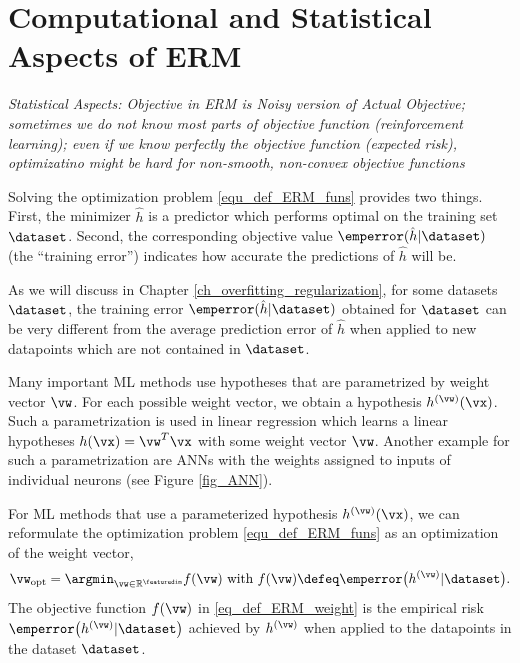 \documentclass[12pt]{report}
\begin{document}
\section{Computational and Statistical Aspects of ERM}
\label{sec_comp_stat_ERM}

\emph{Statistical Aspects: Objective in ERM is Noisy version of Actual Objective; sometimes we do 
not know most parts of objective function (reinforcement learning); even if we know perfectly 
the objective function (expected risk), optimizatino might be hard for non-smooth, non-convex 
objective functions}

Solving the optimization problem \eqref{equ_def_ERM_funs} provides 
two things. First, the minimizer $\hat{h}$ is a predictor which performs 
optimal on the training set $\dataset$. Second, the corresponding 
objective value $\emperror(\hat{h}|\dataset)$ (the ``training error'') 
indicates how accurate the predictions of $\hat{h}$ will be. 

As we will discuss in Chapter \ref{ch_overfitting_regularization}, for some 
datasets $\dataset$, the training error $\emperror(\hat{h}|\dataset)$ obtained 
for $\dataset$ can be very different from the average prediction error of $\hat{h}$ 
when applied to new datapoints which are not contained in $\dataset$. 

Many important ML methods use hypotheses that are parametrized by 
weight vector $\vw$. For each possible weight vector, we obtain a 
hypothesis $h^{(\vw)}(\vx)$. Such a parametrization is used in linear 
regression which learns a linear hypotheses $h(\vx) = \vw^{T} \vx$ with 
some weight vector $\vw$. Another example for such a parametrization 
are ANNs with the weights assigned to inputs of individual neurons (see Figure \ref{fig_ANN}). 

For ML methods that use a parameterized hypothesis $h^{(\vw)}(\vx)$, 
we can reformulate the optimization problem \eqref{equ_def_ERM_funs} 
as an optimization of the weight vector, 
\begin{equation}
\label{eq_def_ERM_weight}
    \vw_{\rm opt} = \argmin_{\vw \in \mathbb{R}^{\featuredim}} f(\vw) \mbox{ with } f(\vw) \defeq \emperror\big(h^{(\vw)} |\dataset\big). 
\end{equation}
The objective function $f(\vw)$ in \eqref{eq_def_ERM_weight} is 
the empirical risk $\emperror\big(h^{(\vw)} |\dataset\big)$ achieved 
by $h^{(\vw)}$ when applied to the datapoints in the dataset $\dataset$. 
\end{document}
